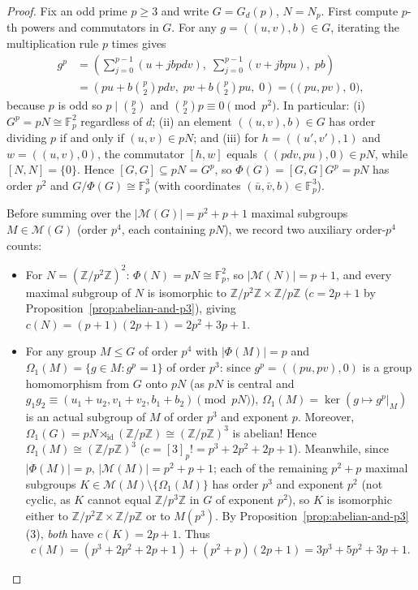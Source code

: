 \documentclass[11pt,a4paper]{article}
\theoremstyle{definition}
\newcommand{\Fp}{\mathbb{F}_p}
\begin{document}
\begin{proof}
Fix an odd prime $p \ge 3$ and write $G = G_d(p)$, $N = N_p$. First compute $p$-th powers and commutators in $G$. For any $g = ((u, v), b) \in G$, iterating the multiplication rule $p$ times gives
\begin{align*}
  g^p &= \left(\sum_{j=0}^{p-1} (u + j b p d v),\; \sum_{j=0}^{p-1} (v + j b p u),\; p b\right) \\
      &= \left(p u + b \binom{p}{2} p d v,\; p v + b \binom{p}{2} p u,\; 0\right) = \bigl((p u, p v),\, 0\bigr),
\end{align*}
because $p$ is odd so $p \mid \binom{p}{2}$ and $\binom{p}{2} p \equiv 0 \pmod{p^2}$. In particular:
(i) $G^p = pN \cong \Fp^2$ regardless of $d$;
(ii) an element $((u, v), b) \in G$ has order dividing $p$ if and only if $(u, v) \in pN$; and
(iii) for $h = ((u', v'), 1)$ and $w = ((u, v), 0)$, the commutator $[h, w]$ equals $((p d v, p u), 0) \in pN$, while $[N, N] = \{0\}$.
Hence $[G, G] \subseteq pN = G^p$, so $\Phi(G) = [G, G]G^p = pN$ has order $p^2$ and $G/\Phi(G) \cong \Fp^3$ (with coordinates $(\bar{u}, \bar{v}, b) \in \Fp^3$).

Before summing over the $|\mathcal{M}(G)| = p^2 + p + 1$ maximal subgroups $M \in \mathcal{M}(G)$ (order $p^4$, each containing $pN$), we record two auxiliary order-$p^4$ counts:
\begin{itemize}
  \item For $N = (\mathbb{Z}/p^2\mathbb{Z})^2$: $\Phi(N) = pN \cong \Fp^2$, so $|\mathcal{M}(N)| = p + 1$, and every maximal subgroup of $N$ is isomorphic to $\mathbb{Z}/p^2\mathbb{Z} \times \mathbb{Z}/p\mathbb{Z}$ ($c = 2p + 1$ by Proposition~\ref{prop:abelian-and-p3}), giving $c(N) = (p + 1)(2p + 1) = 2p^2 + 3p + 1$.
  \item For any group $M \le G$ of order $p^4$ with $|\Phi(M)| = p$ and $\Omega_1(M) = \{g \in M : g^p = 1\}$ of order $p^3$: since $g^p = ((pu, pv), 0)$ is a group homomorphism from $G$ onto $pN$ (as $pN$ is central and $g_1 g_2 \equiv (u_1+u_2, v_1+v_2, b_1+b_2) \pmod{pN}$), $\Omega_1(M) = \ker(g \mapsto g^p|_M)$ is an actual subgroup of $M$ of order $p^3$ and exponent $p$. Moreover, $\Omega_1(G) = pN \rtimes_{\mathrm{id}} (\mathbb{Z}/p\mathbb{Z}) \cong (\mathbb{Z}/p\mathbb{Z})^3$ is abelian! Hence $\Omega_1(M) \cong (\mathbb{Z}/p\mathbb{Z})^3$ ($c = [3]_p! = p^3 + 2p^2 + 2p + 1$). Meanwhile, since $|\Phi(M)| = p$, $|\mathcal{M}(M)| = p^2 + p + 1$; each of the remaining $p^2 + p$ maximal subgroups $K \in \mathcal{M}(M) \setminus \{\Omega_1(M)\}$ has order $p^3$ and exponent $p^2$ (not cyclic, as $K$ cannot equal $\mathbb{Z}/p^3\mathbb{Z}$ in $G$ of exponent $p^2$), so $K$ is isomorphic either to $\mathbb{Z}/p^2\mathbb{Z} \times \mathbb{Z}/p\mathbb{Z}$ or to $M(p^3)$. By Proposition~\ref{prop:abelian-and-p3}(3), \emph{both} have $c(K) = 2p + 1$. Thus
  \[
    c(M) = (p^3 + 2p^2 + 2p + 1) + (p^2 + p)(2p + 1) = 3p^3 + 5p^2 + 3p + 1.
  \]
\end{itemize}


\end{proof}
\end{document}
